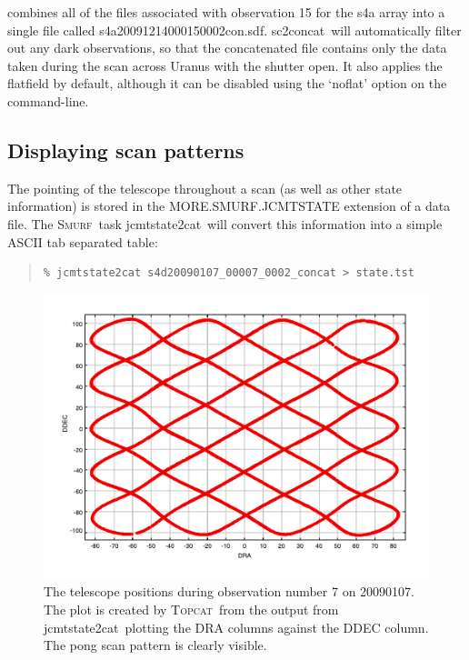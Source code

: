 \documentclass[twoside,11pt]{article}
\newcommand{\xref}[3]{#1}
\newcommand{\xlabel}[1]{}
\renewcommand{\_}{\texttt{\symbol{95}}}
\newenvironment{myquote}{\begin{quote}\begin{small}}{\end{small}\end{quote}}
\newcommand{\smurf}{\xref{\textsc{Smurf}}{sun258}{}}
\newcommand{\topcat}{\xref{\textsc{Topcat}}{sun253}{}}
\newcommand{\task}[1]{\textsf{#1}}
\newcommand{\concat}{\xref{\task{sc2concat}}{sun258}{SC2CONCAT}}
\newcommand{\jcmtstate}{\xref{\task{jcmtstate2cat}}{sun258}{JCMTSTATE2CAT}}
\begin{document}
combines all of the files associated with observation 15 for the s4a
array into a single file called
s4a20091214\_00015\_0002\_con.sdf. \concat\ will automatically filter
out any dark observations, so that the concatenated file contains only
the data taken during the scan across Uranus with the shutter open. It
also applies the flatfield by default, although it can be disabled using
the `noflat' option on the command-line.

\subsection{\xlabel{display_scan}Displaying scan patterns}

The pointing of the telescope throughout a scan (as well as other
state information) is stored in the MORE.SMURF.JCMTSTATE extension of
a data file. The \smurf\ task \jcmtstate\ will convert this
information into a simple ASCII tab separated table:

\begin{myquote}
\begin{verbatim}
% jcmtstate2cat s4d20090107_00007_0002_concat > state.tst
\end{verbatim}
\end{myquote}

\begin{figure}
\begin{center}
\includegraphics{sc19_scan_pattern}
\caption{The telescope positions during observation number 7 on
  20090107. The plot is created by \topcat\ from the output from
\jcmtstate\ plotting the DRA columns against the DDEC column. The pong
scan pattern is clearly visible.}
\label{fig:topcat}
\end{center}
\end{figure}
\end{document}
